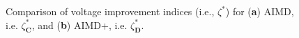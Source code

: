 \begin{figure}[htb]\centering
{}
\caption{Comparison of voltage improvement indices (i.e., $\zeta^{*}$) for (\textbf{a}) AIMD, i.e. $\zeta_\textbf{C}^{*}$, and (\textbf{b}) AIMD+, i.e. $\zeta_\textbf{D}^{*}$.}
 \label{ch1:fig:voltage-comparison-large}
\end{figure}
